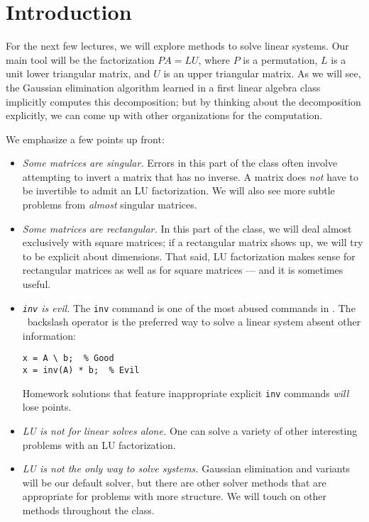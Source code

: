 \section{Introduction}

For the next few lectures, we will explore methods to solve linear
systems.  Our main tool will be the factorization $PA = LU$, where
$P$ is a permutation, $L$ is a unit lower triangular matrix, and $U$ is
an upper triangular matrix.  As we will see, the Gaussian elimination
algorithm learned in a first linear algebra class implicitly computes
this decomposition; but by thinking about the decomposition explicitly,
we can come up with other organizations for the computation.

We emphasize a few points up front:
\begin{itemize}
\item {\em Some matrices are singular.}  Errors in this part of the class
  often involve attempting to invert a matrix that has no inverse.
  A matrix does {\em not} have to be invertible to admit an LU factorization.
  We will also see more subtle problems from {\em almost} singular matrices.
\item {\em Some matrices are rectangular.}  In this part of the class,
  we will deal almost exclusively with square matrices; if a rectangular
  matrix shows up, we will try to be explicit about dimensions.  That
  said, LU factorization makes sense for rectangular matrices as well
  as for square matrices --- and it is sometimes useful.
\item {\em {\tt inv} is evil.}  The {\tt inv} command is one of the most
  abused commands in \matlab.  The \matlab\ backslash operator is the
  preferred way to solve a linear system absent other information:
\begin{lstlisting}
x = A \ b;  % Good
x = inv(A) * b;  % Evil
\end{lstlisting}
  Homework solutions that feature inappropriate explicit {\tt inv}
  commands {\em will} lose points.
\item {\em LU is not for linear solves alone.}  One can solve a variety
  of other interesting problems with an LU factorization.
\item {\em LU is not the only way to solve systems.}  Gaussian elimination
  and variants will be our default solver, but there are other solver
  methods that are appropriate for problems with more structure.
  We will touch on other methods throughout the class.
\end{itemize}

